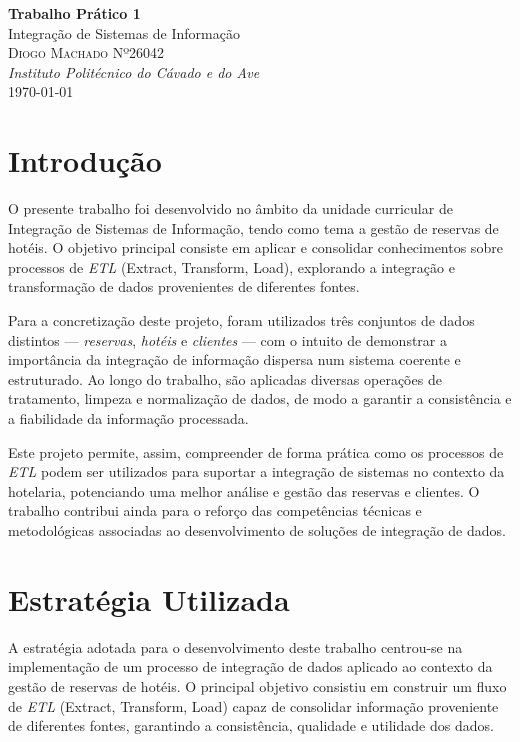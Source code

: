\documentclass[a4paper, 12pt]{article} %
\renewcommand{\maketitle}{
\begin{titlepage}
\begin{center}
\vspace*{1cm}
{\Huge\textbf{Trabalho Prático 1}}\\[0.5cm] %
{\Large Integração de Sistemas de Informação}\\[2cm] %
{\large \textsc{
		Diogo Machado Nº26042
	}}\\[0.5cm] %
{\textit{Instituto Politécnico do Cávado e do Ave}}\\[1.5cm] %
{\large \today} %
\vfill
\end{center}
\end{titlepage}
}
\begin{document}
\maketitle %

\newpage
\renewcommand{\contentsname}{Índice}
\tableofcontents

\newpage
\renewcommand{\listfigurename}{Lista de Figuras}
\listoffigures

\newpage
\section{Introdução}

O presente trabalho foi desenvolvido no âmbito da unidade curricular de Integração de Sistemas de Informação, tendo como tema a gestão de reservas de hotéis. O objetivo principal consiste em aplicar e consolidar conhecimentos sobre processos de \textit{ETL} (Extract, Transform, Load), explorando a integração e transformação de dados provenientes de diferentes fontes.

Para a concretização deste projeto, foram utilizados três conjuntos de dados distintos — \textit{reservas}, \textit{hotéis} e \textit{clientes} — com o intuito de demonstrar a importância da integração de informação dispersa num sistema coerente e estruturado. Ao longo do trabalho, são aplicadas diversas operações de tratamento, limpeza e normalização de dados, de modo a garantir a consistência e a fiabilidade da informação processada.

Este projeto permite, assim, compreender de forma prática como os processos de \textit{ETL} podem ser utilizados para suportar a integração de sistemas no contexto da hotelaria, potenciando uma melhor análise e gestão das reservas e clientes. O trabalho contribui ainda para o reforço das competências técnicas e metodológicas associadas ao desenvolvimento de soluções de integração de dados.

\newpage

\section{Estratégia Utilizada}

A estratégia adotada para o desenvolvimento deste trabalho centrou-se na implementação de um processo de integração de dados aplicado ao contexto da gestão de reservas de hotéis. O principal objetivo consistiu em construir um fluxo de \textit{ETL} (Extract, Transform, Load) capaz de consolidar informação proveniente de diferentes fontes, garantindo a consistência, qualidade e utilidade dos dados.
\end{document}
